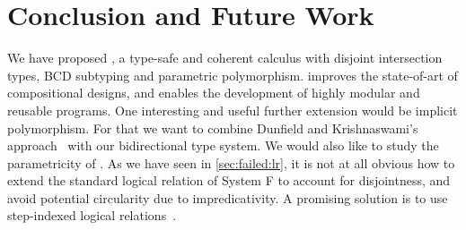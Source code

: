
\section{Conclusion and Future Work}
\label{sec:conclusion}

We have proposed \fnamee, a type-safe and coherent calculus with disjoint
intersection types, BCD subtyping and parametric polymorphism. \fnamee improves
the state-of-art of compositional designs, and enables the development of highly
modular and reusable programs. One interesting and useful further extension
would be implicit polymorphism. For that we want to combine
Dunfield and Krishnaswami's approach~\cite{dunfield2013complete} with our bidirectional type system.
We would also like to study the parametricity of \fnamee. As we have seen in
\cref{sec:failed:lr}, it is not at all obvious how to extend the standard
logical relation of System F to account for disjointness, and avoid potential
circularity due to impredicativity. A promising solution is to use step-indexed
logical relations~\cite{ahmed2006step}. 


